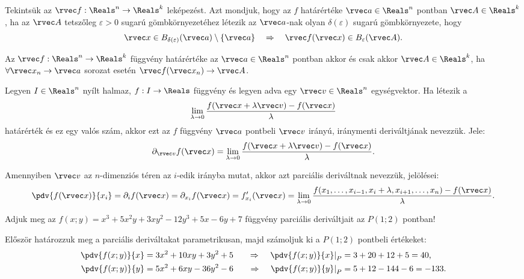 \documentclass[a4paper, 12pt, fleqn]{scrartcl}
\begin{document}
\begin{definition}
  Tekintsük az $\rvec f: \Reals^n \to \Reals^k$ leképezést. Azt mondjuk, hogy az
  $f$ határértéke $\rvec a \in \Reals^n$ pontban $\rvec A \in \Reals^k$, ha az
  $\rvec A$ tetszőleg $\varepsilon > 0$ sugarú gömbkörnyezetéhez létezik az
  $\rvec a$-nak olyan $\delta(\varepsilon)$ sugarú gömbkörnyezete, hogy
  $$
    \rvec x \in B_{\delta(\varepsilon)}(\rvec a) \setminus \{\rvec a\}
    \quad \Rightarrow \quad
    \rvec f(\rvec x) \in B_\varepsilon(\rvec A)
    \text.
  $$
\end{definition}

\begin{theorem}
  Az $\rvec f: \Reals^n \to \Reals^k$ függvény határértéke az $\rvec a \in \Reals^n$
  pontban akkor és csak akkor $\rvec A \in \Reals^k$, ha
  $\forall \rvec x_n \to \rvec a$ sorozat esetén
  $\rvec f(\rvec x_n) \to \rvec A$.
\end{theorem}

\clearpage
\begin{definition}
  Legyen $I \in \Reals^n$ nyílt halmaz, $f: I \to \Reals$ függvény és
  legyen adva egy $\rvec v \in \Reals^n$ egységvektor. Ha létezik a
  $$
    \lim_{\lambda \to 0} \frac{
      f(\rvec x + \lambda \rvec v) - f(\rvec x)
    }{
      \lambda
    }
  $$
  határérték és ez egy valós szám, akkor ezt az $f$ függvény $\rvec a$
  pontbeli $\rvec v$ irányú, iránymenti deriváltjának nevezzük. Jele:
  $$
    \partial_{\rvec v} f(\rvec x) = \lim_{\lambda \to 0} \frac{
      f(\rvec x + \lambda \rvec v) - f(\rvec x)
    }{
      \lambda
    }
    \text.
  $$
\end{definition}

\begin{note}
  Amennyiben $\rvec v$ az $n$-dimenziós téren az $i$-edik irányba mutat,
  akkor azt parciális deriváltnak nevezzük, jelölései:
  $$
    \pdv{f(\rvec x)}{x_i}
    = \partial_i f(\rvec x)
    = \partial_{x_i} f(\rvec x)
    = f'_{x_i}(\rvec x)
    = \lim_{\lambda \to 0} \frac{
      f(x_1, \ldots, x_{i-1}, x_i + \lambda, x_{i+1}, \ldots, x_n) - f(\rvec x)
    }{
      \lambda
    }
    \text.
  $$
\end{note}

\begin{example}
  Adjuk meg az $f(x; y) = x^3 + 5x^2y + 3xy^2 - 12y^3 + 5x - 6y + 7$ függvény
  parciális deriváltjait az $P(1;2)$ pontban!

  Először határozzuk meg a parciális deriváltakat parametrikusan, majd
  számoljuk ki a $P(1;2)$ pontbeli értékeket:
  \begin{alignat*}{9}
    \pdv{f(x; y)}{x}                  & = 3x^2 + 10xy + 3y^2 + 5
                                      & \quad\Rightarrow\quad
    \left.\pdv{f(x; y)}{x}\right|_{P} & = 3 + 20 + 12 + 5 = 40
    \text,
    \\
    \pdv{f(x; y)}{y}                  & = 5x^2 + 6xy - 36y^2 - 6
                                      & \quad\Rightarrow\quad
    \left.\pdv{f(x; y)}{y}\right|_{P} & = 5 + 12 - 144 - 6 = -133
    \text.
  \end{alignat*}
\end{example}
\end{document}

